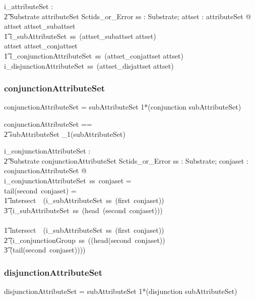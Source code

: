 \documentclass{article}
\def\bnf#1{{\scriptsize {{#1}} }}
\begin{document}
\begin{gendef}
   i\_attributeSet : \\
\t2 Substrate \fun attributeSet \fun Sctids\_or\_Error
\where
   \forall ss : Substrate; attset : attributeSet @ \\
   \IF attset \in \ran attset\_subattset \\
\t1 \THEN i\_subAttributeSet~ss~(attset\_subattset \inv attset) \\
   \ELSE \IF attset \in \ran attset\_conjattset \\
\t1 \THEN i\_conjunctionAttributeSet~ss~(attset\_conjattset \inv attset) \\
  \ELSE i\_disjunctionAttributeSet~ss~(attset\_disjattset \inv attset)
\end{gendef}

\subsubsection{conjunctionAttributeSet}
\begin{framed}
\noindent
\bnf{conjunctionAttributeSet = subAttributeSet 1*(conjunction subAttributeSet)}
\end{framed}

\begin{zed}
conjunctionAttributeSet == \\
\t2 subAttributeSet \cross \seq_1(subAttributeSet)
\end{zed}

\begin{gendef}
    i\_conjunctionAttributeSet : \\
\t2 Substrate \fun conjunctionAttributeSet \fun Sctids\_or\_Error
\where
   \forall ss : Substrate;  conjaset : conjunctionAttributeSet @ \\
i\_conjunctionAttributeSet~ss~conjaset = \\
   \IF tail(second~conjaset) = \langle \rangle \THEN \\
\t1 intersect~~(i\_subAttributeSet~ss~(first~conjaset)) \\
\t3 (i\_subAttributeSet~ss~(head~(second~conjaset))) \\
   \ELSE \\
\t1 intersect~~(i\_subAttributeSet~ss~(first~conjaset)) \\
\t2 (i\_conjunctionGroup~ss~((head(second~conjaset)) \\
\t3 (tail(second~conjaset))))
\end{gendef}

\subsubsection{disjunctionAttributeSet}
\begin{framed}
\noindent
\bnf{disjunctionAttributeSet = subAttributeSet 1*(disjunction subAttributeSet)}
\end{framed}
\end{document}
